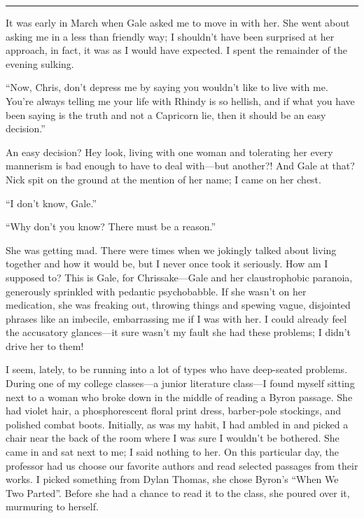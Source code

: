 \begin{center}\rule{0.5\linewidth}{0.5pt}\end{center}

It was early in March when Gale asked me to move in with her. She went
about asking me in a less than friendly way; I shouldn't have been
surprised at her approach, in fact, it was as I would have expected. I
spent the remainder of the evening sulking.

``Now, Chris, don't depress me by saying you wouldn't like to live with
me. You're always telling me your life with Rhindy is so hellish, and if
what you have been saying is the truth and not a Capricorn lie, then it
should be an easy decision.''

An easy decision? Hey look, living with one woman and tolerating her
every mannerism is bad enough to have to deal with---but another?! And
Gale at that? Nick spit on the ground at the mention of her name; I came
on her chest.

``I don't know, Gale.''

``Why don't you know? There must be a reason.''

She was getting mad. There were times when we jokingly talked about
living together and how it would be, but I never once took it seriously.
How am I supposed to? This is Gale, for Chrissake---Gale and her
claustrophobic paranoia, generously sprinkled with pedantic
psychobabble. If she wasn't on her medication, she was freaking out,
throwing things and spewing vague, disjointed phrases like an imbecile,
embarrassing me if I was with her. I could already feel the accusatory
glances---it sure wasn't my fault she had these problems; I didn't drive
her to them!

I seem, lately, to be running into a lot of types who have deep-seated
problems. During one of my college classes---a junior literature
class---I found myself sitting next to a woman who broke down in the
middle of reading a Byron passage. She had violet hair, a phosphorescent
floral print dress, barber-pole stockings, and polished combat boots.
Initially, as was my habit, I had ambled in and picked a chair near the
back of the room where I was sure I wouldn't be bothered. She came in
and sat next to me; I said nothing to her. On this particular day, the
professor had us choose our favorite authors and read selected passages
from their works. I picked something from Dylan Thomas, she chose
Byron's ``When We Two Parted''. Before she had a chance to read it to
the class, she poured over it, murmuring to herself.

